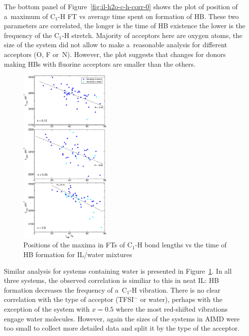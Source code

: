 The bottom panel of Figure~\ref{fig:il-h2o-c-h-corr-0} shows the plot of position of a~maximum of C$_1$-H FT vs average time spent on formation of HB. These two parameters are correlated, the longer is the time of HB existence the lower is the frequency of the C$_1$-H stretch. Majority of acceptors here are oxygen atoms, the size of the system did not allow to make a~reasonable analysis for different acceptors (O, F or~N). However, the plot suggests that changes for donors making HBs with fluorine acceptors are smaller than the others.

\begin{figure}[ht]
    \centering
    \includegraphics[width=0.4\textwidth]{img/4-ir-spectra-from-aimd-simulations/4-il-h2o/c-h-corr-mixtures.png}
    \caption{Positions of the maxima in FTs of C$_1$-H bond lengths vs the time of HB formation for IL/water mixtures}
    \label{fig:il-h2o-c-h-corr-mixtures}
\end{figure}

Similar analysis for systems containing water is presented in Figure~\ref{fig:il-h2o-c-h-corr-mixtures}. In all three systems, the observed correlation is similiar to this in neat IL: HB formation decreases the frequency of a~C$_1$-H vibration. There is no clear correlation with the type of acceptor (TFSI$^{-}$ or water), perhaps with the exception of the system with $x = 0.5$ where the most red-shifted vibrations engage water molecules. However, again the sizes of the systems in AIMD were too small to collect more detailed data and split it by the type of the acceptor.

